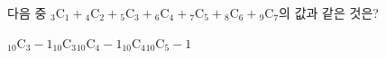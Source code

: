 다음 중 ${}_3\mathrm{C}_1+{}_4\mathrm{C}_2+{}_5\mathrm{C}_3+{}_6\mathrm{C}_4+{}_7\mathrm{C}_5+{}_8\mathrm{C}_6+{}_9\mathrm{C}_7$의 값과 같은 것은?
\begin{choices32}{${}_{10}\mathrm{C}_3-1$}{${}_{10}\mathrm{C}_3$}{${}_{10}\mathrm{C}_4-1$}{${}_{10}\mathrm{C}_4$}{${}_{10}\mathrm{C}_5-1$}\end{choices32}
